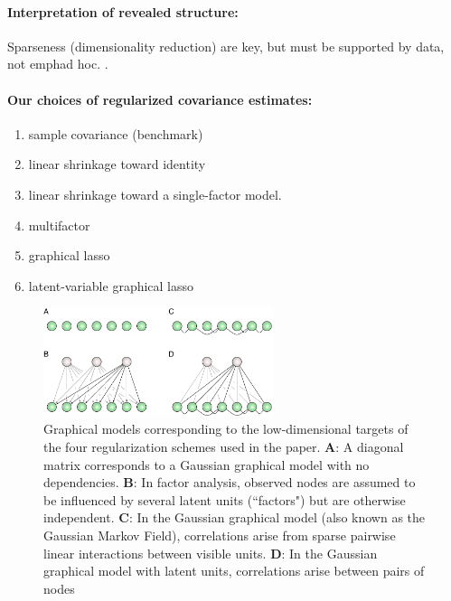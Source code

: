 \paragraph{Interpretation of revealed structure:}
Sparseness (dimensionality reduction) are key, but must be supported by data, not emph{ad hoc}. \citep{Fan:2006,Malmersjo:2013}.

\paragraph{Our choices of regularized covariance estimates:}
\begin{enumerate}[\qquad 1.\;\;]
\item sample covariance (benchmark)
\item linear shrinkage toward identity 
\item linear shrinkage toward a single-factor model.
\item multifactor
\item graphical lasso
\item latent-variable graphical lasso
\end{enumerate}


\begin{figure}
\centering
\includegraphics[width=0.6\textwidth]{figures/Figure2.pdf}
\caption{
Graphical models corresponding to the low-dimensional targets of the four regularization schemes used in the paper.
\textbf{A}: A diagonal matrix corresponds to a Gaussian graphical model with no dependencies. 
\textbf{B}: In factor analysis, observed nodes are assumed to be influenced by several latent units (``factors") but are otherwise independent. 
\textbf{C}: In the Gaussian graphical model (also known as the Gaussian Markov Field), correlations arise from sparse pairwise linear interactions between visible units. 
\textbf{D}: In the Gaussian graphical model with latent units, correlations arise  between pairs of nodes 
}\label{fig:02}
\end{figure}

